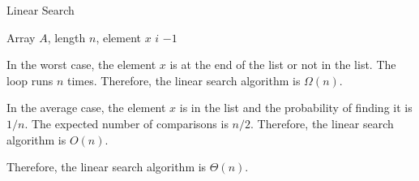 \documentclass{article}
\begin{document}
\begin{algorithm}
\caption{Linear Search}
\begin{algorithmic}[1]
\Require Array $A$, length $n$, element $x$
        \State \Return $i$
    \EndIf
\EndFor
\State \Return $-1$
\end{algorithmic}
\end{algorithm}

In the worst case, the element $x$ is at the end of the list or not in the list. The loop runs $n$ times. Therefore, the linear search algorithm is $\Omega(n)$.

In the average case, the element $x$ is in the list and the probability of finding it is $1/n$. The expected number of comparisons is $n/2$. Therefore, the linear search algorithm is $O(n)$.

Therefore, the linear search algorithm is $\Theta(n)$.
\end{document}
